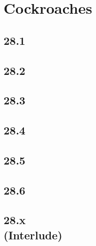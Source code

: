 \part{Cockroaches}
 \chapter{28.1}
 \chapter{28.2}
 \chapter{28.3}
 \chapter{28.4}
 \chapter{28.5}
 \chapter{28.6}
 \chapter[28.x (Interlude)]{28.x\\(Interlude)}








